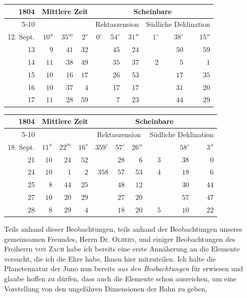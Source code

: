 \begin{center}
\begingroup\fontsize{10}{12}\selectfont\setlength{\tabcolsep}{3pt}\renewcommand{\arraystretch}{1.12}
\begin{tabular}{r|rrr|rrr|rrr}
1804 & \multicolumn{3}{c|}{Mittlere Zeit} & \multicolumn{6}{c}{Scheinbare} \\ \cline{5-10}
 & \multicolumn{3}{c|}{} & \multicolumn{3}{c|}{Rektaszension} & \multicolumn{3}{c}{Südliche Deklination} \\ \hline
12. Sept. & $10^u$ & $35^m$ & $2^s$ & $0^\circ$ & $54'$ & $31''$ & $1^\circ$ & $38'$ & $15''$ \\
13 & $9$ & $41$ & $32$ &  & $45$ & $24$ &  & $50$ & $59$ \\
14 & $11$ & $38$ & $49$ &  & $35$ & $37$ & $2$ & $5$ & $1$ \\
15 & $10$ & $16$ & $17$ &  & $26$ & $53$ &  & $17$ & $35$ \\
16 & $10$ & $37$ & $4$ &  & $17$ & $17$ &  & $31$ & $20$ \\
17 & $11$ & $28$ & $59$ &  & $7$ & $23$ &  & $44$ & $29$ \\
\end{tabular}\endgroup
\end{center}
\begin{center}
\begingroup\fontsize{10}{12}\selectfont\setlength{\tabcolsep}{3pt}\renewcommand{\arraystretch}{1.12}
\begin{tabular}{r|rrr|rrr|rrr}
1804 & \multicolumn{3}{c|}{Mittlere Zeit} & \multicolumn{6}{c}{Scheinbare} \\ \cline{5-10}
 & \multicolumn{3}{c|}{} & \multicolumn{3}{c|}{Rektaszension} & \multicolumn{3}{c}{Südliche Deklination} \\ \hline
18. Sept. & $11^u$ & $22^m$ & $16^s$ & $359^\circ$ & $57'$ & $26''$ &  & $58'$ & $3''$ \\
21 & $10$ & $24$ & $52$ &  & $28$ & $6$ & $3$ & $38$ & $0$ \\
24 & $10$ & $1$ & $2$ & $358$ & $57$ & $53$ & $4$ & $18$ & $6$ \\
25 & $8$ & $44$ & $25$ &  & $48$ & $12$ &  & $30$ & $44$ \\
27 & $10$ & $20$ & $29$ &  & $27$ & $20$ &  & $57$ & $47$ \\
28 & $8$ & $29$ & $4$ &  & $18$ & $20$ & $5$ & $10$ & $22$ \\
\end{tabular}\endgroup
\end{center}
%

Teils anhand dieser Beobachtungen, teils anhand der Beobachtungen unseres gemeinsamen Freundes, Herrn Dr. \textsc{Olbers}, und einiger Beobachtungen des Freiherrn \textsc{von Zach} habe ich bereits eine erste Annäherung an die Elemente versucht, die ich die Ehre habe, Ihnen hier mitzuteilen. Ich halte die Planetennatur der Juno nun bereits \emph{aus den Beobachtungen} für erwiesen und glaube hoffen zu dürfen, dass auch die Elemente schon ausreichen, um eine Vorstellung von den ungefähren Dimensionen der Bahn zu geben,

